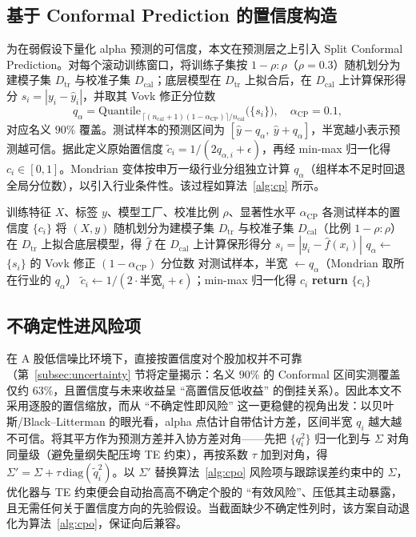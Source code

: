 \subsection{基于 Conformal Prediction 的置信度构造}
\label{subsec:cp_conf}
为在弱假设下量化 alpha 预测的可信度，本文在预测层之上引入 Split Conformal Prediction。对每个滚动训练窗口，将训练子集按 $1-\rho:\rho$（$\rho=0.3$）随机划分为建模子集 $D_{\text{tr}}$ 与校准子集 $D_{\text{cal}}$；底层模型在 $D_{\text{tr}}$ 上拟合后，在 $D_{\text{cal}}$ 上计算保形得分 $s_i=|y_i-\hat y_i|$，并取其 Vovk 修正分位数
\begin{equation}
q_\alpha = \text{Quantile}_{\,\lceil (n_{\text{cal}}+1)(1-\alpha_{\text{CP}})\rceil/n_{\text{cal}}}\big(\{s_i\}\big),\quad \alpha_{\text{CP}}=0.1,
\end{equation}
对应名义 $90\%$ 覆盖。测试样本的预测区间为 $[\hat y - q_\alpha,\ \hat y + q_\alpha]$，半宽越小表示预测越可信。据此定义原始置信度 $\tilde c_i = 1/(2q_{\alpha,i}+\epsilon)$，再经 min-max 归一化得 $c_i\in[0,1]$。Mondrian 变体按申万一级行业分组独立计算 $q_\alpha$（组样本不足时回退全局分位数），以引入行业条件性。该过程如算法~\ref{alg:cp} 所示。

\begin{algorithm}[htbp]
\caption{Split Conformal 校准与置信度构造}
\label{alg:cp}
\begin{algorithmic}[1]
\Require 训练特征 $X$、标签 $y$、模型工厂、校准比例 $\rho$、显著性水平 $\alpha_{\text{CP}}$
\Ensure 各测试样本的置信度 $\{c_i\}$
\State 将 $(X,y)$ 随机划分为建模子集 $D_{\text{tr}}$ 与校准子集 $D_{\text{cal}}$（比例 $1-\rho:\rho$）
\State 在 $D_{\text{tr}}$ 上拟合底层模型，得 $\hat f$
\State 在 $D_{\text{cal}}$ 上计算保形得分 $s_i=|y_i-\hat f(x_i)|$
\State $q_\alpha \gets$ $\{s_i\}$ 的 Vovk 修正 $(1-\alpha_{\text{CP}})$ 分位数
\State 对测试样本，半宽 $\gets q_\alpha$（Mondrian 取所在行业的 $q_\alpha$）
\State $\tilde c_i \gets 1/(2\cdot\text{半宽}_i+\epsilon)$；min-max 归一化得 $c_i$
\State \textbf{return} $\{c_i\}$
\end{algorithmic}
\end{algorithm}

\subsection{不确定性进风险项}
\label{subsec:unc_risk}
在 A 股低信噪比环境下，直接按置信度对个股加权并不可靠（第~\ref{subsec:uncertainty} 节将定量揭示：名义 $90\%$ 的 Conformal 区间实测覆盖仅约 $63\%$，且置信度与未来收益呈 ``高置信反低收益'' 的倒挂关系）。因此本文不采用逐股的置信缩放，而从 ``不确定性即风险'' 这一更稳健的视角出发：以贝叶斯/Black--Litterman 的眼光看，alpha 点估计自带估计方差，区间半宽 $q_i$ 越大越不可信。将其平方作为预测方差并入协方差对角——先把 $\{q_i^2\}$ 归一化到与 $\Sigma$ 对角同量级（避免量纲失配压垮 TE 约束），再按系数 $\tau$ 加到对角，得 $\Sigma' = \Sigma + \tau\,\mathrm{diag}(\tilde q_i^2)$。以 $\Sigma'$ 替换算法~\ref{alg:cpo} 风险项与跟踪误差约束中的 $\Sigma$，优化器与 TE 约束便会自动抬高高不确定个股的 ``有效风险''、压低其主动暴露，且无需任何关于置信度方向的先验假设。当截面缺少不确定性列时，该方案自动退化为算法~\ref{alg:cpo}，保证向后兼容。

